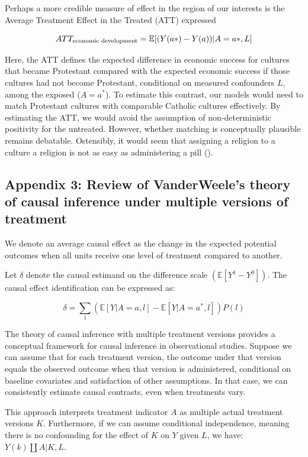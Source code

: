 \documentclass[
  singlecolumn,
  9pt]{article}
\begin{document}
Perhaps a more credible measure of effect in the region of our interests
is the Average Treatment Effect in the Treated (ATT) expressed

\[ATT_{\textnormal{economic~development}} = \mathbb{E}[(Y(a*)- Y(a))|A = a*,L]\]

Here, the ATT defines the expected difference in economic success for
cultures that became Protestant compared with the expected economic
success if those cultures had not become Protestant, conditional on
measured confounders \(L\), among the exposed (\(A = a^*\)). To estimate
this contrast, our models would need to match Protestant cultures with
comparable Catholic cultures effectively. By estimating the ATT, we
would avoid the assumption of non-deterministic positivity for the
untreated. However, whether matching is conceptually plausible remains
debatable. Ostensibly, it would seem that assigning a religion to a
culture a religion is not as easy as administering a pill
().

\subsection{Appendix 3: Review of VanderWeele's theory of causal
inference under multiple versions of
treatment}\label{appendix-3-review-of-vanderweeles-theory-of-causal-inference-under-multiple-versions-of-treatment}

We denote an average causal effect as the change in the expected
potential outcomes when all units receive one level of treatment
compared to another.

Let \(\delta\) denote the causal estimand on the difference scale
\((\mathbb{E}[Y^1 - Y^0])\). The causal effect identification can be
expressed as:

\[ \delta = \sum_l \left( \mathbb{E}[Y|A=a,l] - \mathbb{E}[Y|A=a^*,l] \right) P(l)\]

The theory of causal inference with multiple treatment versions provides
a conceptual framework for causal inference in observational studies.
Suppose we can assume that for each treatment version, the outcome under
that version equals the observed outcome when that version is
administered, conditional on baseline covariates and satisfaction of
other assumptions. In that case, we can consistently estimate causal
contrasts, even when treatments vary.

This approach interprets treatment indicator \(A\) as multiple actual
treatment versions \(K\). Furthermore, if we can assume conditional
independence, meaning there is no confounding for the effect of \(K\) on
\(Y\) given \(L\), we have: \(Y(k)\coprod A|K,L\).
\end{document}
